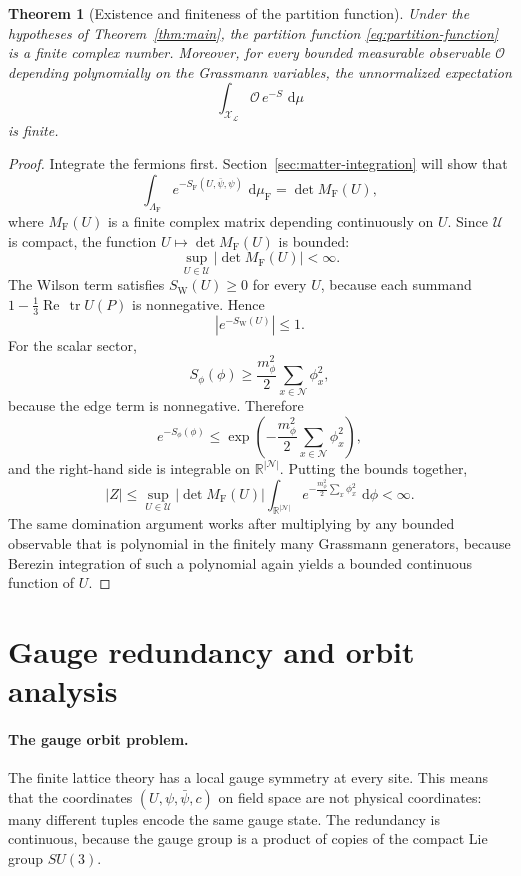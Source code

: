 \documentclass[11pt]{article}
\newtheorem{theorem}{Theorem}[section]
\theoremstyle{remark}
\newcommand{\R}{\mathbb R}
\newcommand{\mcN}{\mathcal N}
\newcommand{\mcU}{\mathscr U}
\newcommand{\mcX}{\mathscr X}
\newcommand{\mcO}{\mathcal O}
\newcommand{\tr}{\operatorname{tr}}
\newcommand{\Ree}{\operatorname{Re}}
\newcommand{\dd}{\,\mathrm d}
\begin{document}
\begin{theorem}[Existence and finiteness of the partition function]
\label{thm:partition-finite}
Under the hypotheses of Theorem~\ref{thm:main}, the partition function
\eqref{eq:partition-function} is a finite complex number.  Moreover, for every
bounded measurable observable $\mcO$ depending polynomially on the Grassmann
variables, the unnormalized expectation
\[
\int_{\mcX_\mathcal L}\mcO\,e^{-S}\,\dd\mu
\]
is finite.
\end{theorem}
\begin{proof}
Integrate the fermions first.  Section~\ref{sec:matter-integration} will show
that
\[
\int_{\Lambda_{\mathrm F}}e^{-S_{\mathrm F}(U,\bar\psi,\psi)}\,\dd\mu_{\mathrm F}
=\det M_{\mathrm F}(U),
\]
where $M_{\mathrm F}(U)$ is a finite complex matrix depending continuously on
$U$.  Since $\mcU$ is compact, the function $U\mapsto \det M_{\mathrm F}(U)$ is
bounded:
\[
\sup_{U\in\mcU}|\det M_{\mathrm F}(U)|<\infty.
\]
The Wilson term satisfies $S_{\mathrm W}(U)\ge 0$ for every $U$, because each
summand $1-\frac13\Ree\,\tr U(P)$ is nonnegative.  Hence
\[
|e^{-S_{\mathrm W}(U)}|\le 1.
\]
For the scalar sector,
\[
S_\phi(\phi)
\ge
\frac{m_\phi^2}{2}\sum_{x\in\mcN}\phi_x^2,
\]
because the edge term is nonnegative.
Therefore
\[
e^{-S_\phi(\phi)}
\le
\exp\!\left(-\frac{m_\phi^2}{2}\sum_{x\in\mcN}\phi_x^2\right),
\]
and the right-hand side is integrable on $\R^{|\mcN|}$.
Putting the bounds together,
\[
|Z|
\le
\sup_{U\in\mcU}|\det M_{\mathrm F}(U)|
\int_{\R^{|\mcN|}}
e^{-\frac{m_\phi^2}{2}\sum_x\phi_x^2}\,\dd\phi
<\infty.
\]
The same domination argument works after multiplying by any bounded observable
that is polynomial in the finitely many Grassmann generators, because Berezin
integration of such a polynomial again yields a bounded continuous function of
$U$.
\end{proof}

\section{Gauge redundancy and orbit analysis}
\label{sec:orbits}

\paragraph{The gauge orbit problem.}
The finite lattice theory has a local gauge symmetry at every site.  This means
that the coordinates $(U,\psi,\bar\psi,c)$ on field space are not physical
coordinates: many different tuples encode the same gauge state.  The redundancy
is continuous, because the gauge group is a product of copies of the compact Lie
group $SU(3)$.
\end{document}
